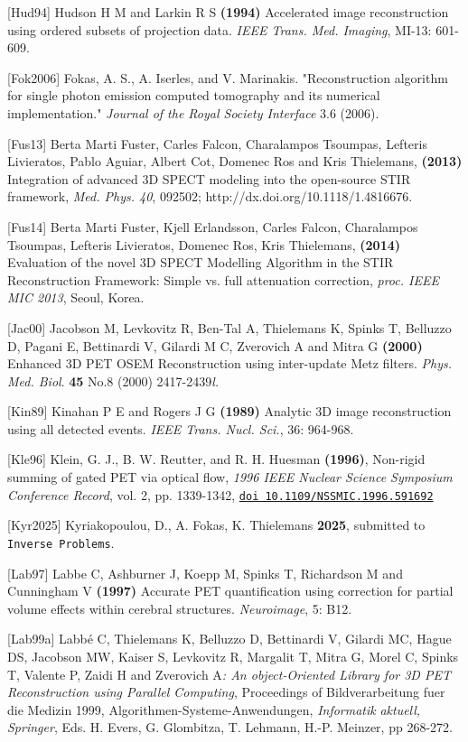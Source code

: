 \documentclass{article}
\def\url#1#2{\mbox{\href{#1}{\tt #2}}}
\begin{document}
{{{{{{{[}Hud94] Hudson H M and Larkin R S \textbf{(1994)} Accelerated image 
reconstruction using ordered subsets of projection data. \textit{IEEE 
Trans. Med. Imaging}, MI-13: 601-609.

{[}Fok2006] Fokas, A. S., A. Iserles, and V. Marinakis. "Reconstruction algorithm for
single photon emission computed tomography and its numerical implementation." \textit{Journal of the Royal Society Interface} 3.6 (2006).

{[}Fus13]  Berta Marti Fuster, Carles Falcon, Charalampos Tsoumpas, Lefteris Livieratos, Pablo Aguiar, Albert Cot, Domenec Ros and Kris Thielemans, \textbf{ (2013)} Integration of advanced 3D SPECT modeling into the open-source STIR framework, \textit{Med. Phys. 40}, 092502; http://dx.doi.org/10.1118/1.4816676.

{[}Fus14] Berta Marti Fuster, Kjell Erlandsson, Carles Falcon, Charalampos Tsoumpas, Lefteris Livieratos, Domenec Ros, Kris Thielemans, \textbf{(2014)}  Evaluation of the novel 3D SPECT Modelling Algorithm in the STIR Reconstruction Framework: Simple vs. full attenuation correction, \textit{proc. IEEE MIC 2013}, Seoul, Korea.

{[}Jac00] Jacobson M, Levkovitz R, Ben-Tal A, Thielemans K, Spinks 
T, Belluzzo D, Pagani E, Bettinardi V, Gilardi M C, Zverovich 
A and Mitra G \textbf{(2000)} Enhanced 3D PET OSEM Reconstruction 
using inter-update Metz filters. \textit{Phys. Med. Biol}. \textbf{45} No.8 
(2000) 2417-2439\textit{l.}


{[}Kin89] Kinahan P E and Rogers J G \textbf{(1989)} Analytic 3D image 
reconstruction using all detected events. \textit{IEEE Trans. Nucl. 
Sci.}, 36: 964-968.


[Kle96]
Klein, G. J., B. W. Reutter, and R. H. Huesman \textbf{(1996)}, Non-rigid summing of gated PET via optical flow, \textit{1996 IEEE Nuclear
Science Symposium Conference Record},
vol. 2, pp. 1339-1342, 
\url{http://dx.doi.org/10.1109/NSSMIC.1996.591692}{doi 10.1109/NSSMIC.1996.591692}

[Kyr2025]
Kyriakopoulou, D., A. Fokas, K. Thielemans \textbf{2025}, submitted to \texttt{Inverse Problems}.

{[}Lab97] Labbe C, Ashburner J, Koepp M, Spinks T, Richardson M 
and Cunningham V \textbf{(1997)} Accurate PET quantification using 
correction for partial volume effects within cerebral structures. \textit{Neuroimage}, 
5: B12.


{[}Lab99a] Labb\'{e} C, Thielemans K, Belluzzo D, Bettinardi V, Gilardi 
MC, Hague DS, Jacobson MW, Kaiser S, Levkovitz R, Margalit T, 
Mitra G, Morel C, Spinks T, Valente P, Zaidi H and Zverovich A\textit{: 
An object-Oriented Library for 3D PET Reconstruction using Parallel 
Computing}, Proceedings of Bildverarbeitung fuer die Medizin 
1999, Algorithmen-Systeme-Anwendungen, \textit{Informatik} 
\textit{aktuell, Springer}, Eds. H. Evers, G. Glombitza, T. Lehmann, 
H.-P. Meinzer, pp 268-272. 

}}}}}}
\end{document}
